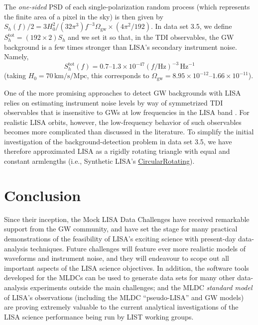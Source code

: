 \documentclass{iopart}
\begin{document}
The \emph{one-sided} PSD of each single-polarization random process (which represents the finite area of a pixel in the sky) is then given by $S_h(f)/2 = 3 H_0^2/(32 \pi^3) f^{-3} \Omega_\mathrm{gw} \times (4 \pi^2 / 192)$.
In data set 3.5, we define $S^\mathrm{tot}_h = (192 \times 2) S_h$ and we set it so that, in the TDI observables, the GW background is a few times stronger than LISA's secondary instrument noise. Namely, 
%
\begin{equation}
S^\mathrm{tot}_h(f) = 0.7\mbox{--}1.3 \times 10^{-47} (f/\mathrm{Hz})^{-3} \, \mathrm{Hz}^{-1}
\end{equation}
%
(taking $H_0 = 70 \, \mathrm{km} / \mathrm{s} / \mathrm{Mpc}$, this corresponds to $\Omega_\mathrm{gw}=8.95\times 10^{-12}\mbox{--}1.66\times 10^{-11}$).

One of the more promising approaches to detect GW backgrounds with LISA relies on estimating instrument noise levels by way of symmetrized TDI observables that is insensitive to GWs at low frequencies in the LISA band \cite{zetapaper,hoganbender,rrv}. For realistic LISA orbits, however, the low-frequency behavior of such observables becomes more complicated than discussed in the literature. To simplify the initial investigation of the background-detection problem in data set 3.5, we have therefore approximated 
LISA as a rigidly rotating triangle with equal and constant armlengths (i.e., Synthetic LISA's \url{CircularRotating}).

\section{Conclusion}

Since their inception, the Mock LISA Data Challenges have received remarkable support from the GW community, and have set the stage for many practical demonstrations of the feasibility of LISA's exciting science with present-day data-analysis techniques. Future challenges will feature ever more realistic models of waveforms and instrument noise, and they will endeavour to scope out all important aspects of the LISA science objectives.
In addition, the software tools developed for the MLDCs \cite{lisatools} can be used to generate data sets for many other data-analysis experiments outside the main challenges; and the MLDC \emph{standard model} of LISA's observations (including the MLDC ``pseudo-LISA'' and GW models) are proving extremely valuable to the current analytical investigations of the LISA science performance being run by LIST working groups.
\end{document}
